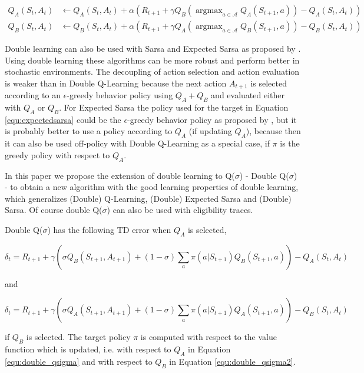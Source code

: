 \documentclass{article} %
\DeclareMathOperator*{\argmax}{argmax}
\begin{document}
\begin{align}
    Q_A(S_t, A_t) &\leftarrow Q_A(S_t, A_t) + \alpha (R_{t+1} + \gamma Q_B(\argmax_{a \in \mathcal{A}} Q_A(S_{t+1}, a)) - Q_A(S_t, A_t)) \\
    Q_B(S_t, A_t) &\leftarrow Q_B(S_t, A_t) + \alpha (R_{t+1} + \gamma Q_A(\argmax_{a \in \mathcal{A}} Q_B(S_{t+1}, a)) - Q_B(S_t, A_t))
\end{align}

Double learning can also be used with Sarsa and Expected Sarsa as proposed by \cite{ganger2016}. Using double learning these algorithms can be more robust and perform better in stochastic environments. The decoupling of action selection and action evaluation is weaker than in Double Q-Learning because the next action $A_{t+1}$ is selected according to an $\epsilon$-greedy behavior policy using $Q_A + Q_B$ and evaluated either with $Q_A$ or $Q_B$. For Expected Sarsa the policy used for the target in Equation \ref{equ:expectedsarsa} could be the $\epsilon$-greedy behavior policy as proposed by \cite{ganger2016}, but it is probably better to use a policy according to $Q_A$ (if updating $Q_A$), because then it can also be used off-policy with Double Q-Learning as a special case, if $\pi$ is the greedy policy with respect to $Q_A$.

In this paper we propose the extension of double learning to Q($\sigma$) - Double Q($\sigma$) - to obtain a new algorithm with the good learning properties of double learning, which generalizes (Double) Q-Learning, (Double) Expected Sarsa and (Double) Sarsa. Of course double Q($\sigma$) can also be used with eligibility traces.

Double Q($\sigma$) has the following TD error when $Q_A$ is selected,

\begin{equation}
\delta_t = R_{t+1} + \gamma \left( \sigma Q_B(S_{t+1}, A_{t+1}) + (1 - \sigma) \sum_a \pi(a|S_{t+1}) Q_B(S_{t+1}, a) \right) - Q_A(S_t, A_t)
\label{equ:double_qsigma}
\end{equation}

and 

\begin{equation}
\delta_t = R_{t+1} + \gamma \left( \sigma Q_A(S_{t+1}, A_{t+1}) + (1 - \sigma) \sum_a \pi(a|S_{t+1}) Q_A(S_{t+1}, a) \right) - Q_B(S_t, A_t)
\label{equ:double_qsigma2}
\end{equation}

if $Q_B$ is selected. The target policy $\pi$ is computed with respect to the value function which is updated, i.e. with respect to $Q_A$ in Equation \ref{equ:double_qsigma} and with respect to $Q_B$ in Equation \ref{equ:double_qsigma2}.
\end{document}
